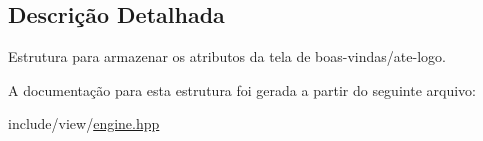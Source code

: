 \subsection{Descrição Detalhada}
Estrutura para armazenar os atributos da tela de boas-\/vindas/ate-\/logo. 

A documentação para esta estrutura foi gerada a partir do seguinte arquivo:\begin{DoxyCompactItemize}
\item 
include/view/\hyperlink{engine_8hpp}{engine.hpp}\end{DoxyCompactItemize}
